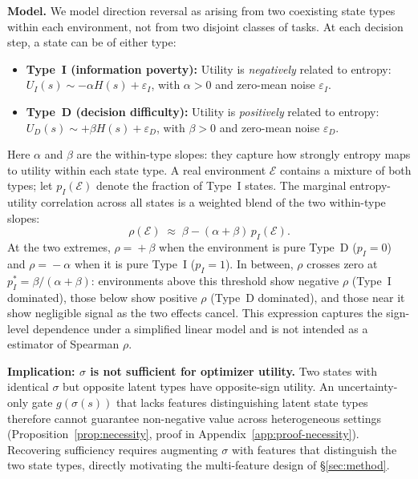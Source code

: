 \textbf{Model.}
We model direction reversal as arising from two coexisting state types within each environment, not from two disjoint classes of tasks. At each decision step, a state can be of either type:
\begin{itemize}[leftmargin=*,nosep]
\item \textbf{Type~I (information poverty):} Utility is \emph{negatively} related to entropy: $U_I(s) \sim -\alpha H(s) + \varepsilon_I$, with $\alpha > 0$ and zero-mean noise $\varepsilon_I$.
\item \textbf{Type~D (decision difficulty):} Utility is \emph{positively} related to entropy: $U_D(s) \sim +\beta H(s) + \varepsilon_D$, with $\beta > 0$ and zero-mean noise $\varepsilon_D$.
\end{itemize}
Here $\alpha$ and $\beta$ are the within-type slopes: they capture how strongly entropy maps to utility within each state type. A real environment $\mathcal{E}$ contains a mixture of both types; let $p_I(\mathcal{E})$ denote the fraction of Type~I states. The marginal entropy-utility correlation across all states is a weighted blend of the two within-type slopes:
\begin{equation}
  \rho(\mathcal{E}) \;\approx\; \beta - (\alpha + \beta)\,p_I(\mathcal{E}).
  \label{eq:direction}
\end{equation}
At the two extremes, $\rho \!=\! +\beta$ when the environment is pure Type~D ($p_I\!=\!0$) and $\rho \!=\! -\alpha$ when it is pure Type~I ($p_I\!=\!1$). In between, $\rho$ crosses zero at $p_I^* = \beta/(\alpha+\beta)$: environments above this threshold show negative $\rho$ (Type~I dominated), those below show positive $\rho$ (Type~D dominated), and those near it show negligible signal as the two effects cancel. This expression captures the sign-level dependence under a simplified linear model and is not intended as a estimator of Spearman $\rho$. 

\textbf{Implication: $\sigma$ is not sufficient for optimizer utility.}
Two states with identical $\sigma$ but opposite latent types have opposite-sign utility. An uncertainty-only gate $g(\sigma(s))$ that lacks features distinguishing latent state types therefore cannot guarantee non-negative value across heterogeneous settings (Proposition~\ref{prop:necessity}, proof in Appendix~\ref{app:proof-necessity}). Recovering sufficiency requires augmenting $\sigma$ with features that distinguish the two state types, directly motivating the multi-feature design of \S\ref{sec:method}.

